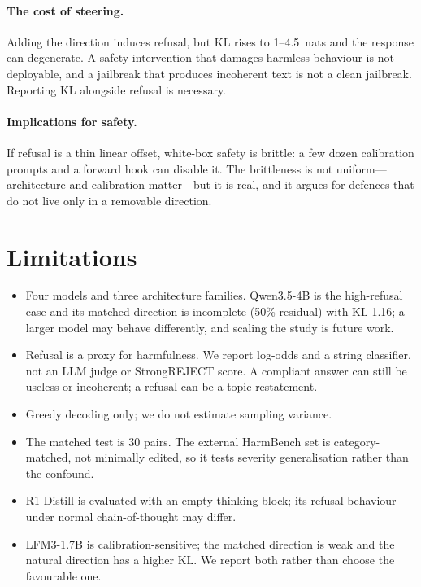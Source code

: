 \documentclass[twoside,11pt]{article}
\begin{document}
\paragraph{The cost of steering.}
Adding the direction induces refusal, but KL rises to 1--4.5~nats and the response
can degenerate. A safety intervention that damages harmless behaviour is not
deployable, and a jailbreak that produces incoherent text is not a clean jailbreak.
Reporting KL alongside refusal is necessary.

\paragraph{Implications for safety.}
If refusal is a thin linear offset, white-box safety is brittle: a few dozen
calibration prompts and a forward hook can disable it. The brittleness is not
uniform---architecture and calibration matter---but it is real, and it argues for
defences that do not live only in a removable direction.

\section{Limitations}

\begin{itemize}[leftmargin=1.2em,itemsep=2pt,topsep=2pt]
\item Four models and three architecture families. Qwen3.5-4B is the high-refusal
case and its matched direction is incomplete (50\% residual) with KL 1.16; a larger
model may behave differently, and scaling the study is future work.
\item Refusal is a proxy for harmfulness. We report log-odds and a string
classifier, not an LLM judge or StrongREJECT score. A compliant answer can still be
useless or incoherent; a refusal can be a topic restatement.
\item Greedy decoding only; we do not estimate sampling variance.
\item The matched test is 30 pairs. The external HarmBench set is category-matched,
not minimally edited, so it tests severity generalisation rather than the confound.
\item R1-Distill is evaluated with an empty thinking block; its refusal behaviour
under normal chain-of-thought may differ.
\item LFM3-1.7B is calibration-sensitive; the matched direction is weak and the
natural direction has a higher KL. We report both rather than choose the favourable
one.
\end{itemize}
\end{document}
